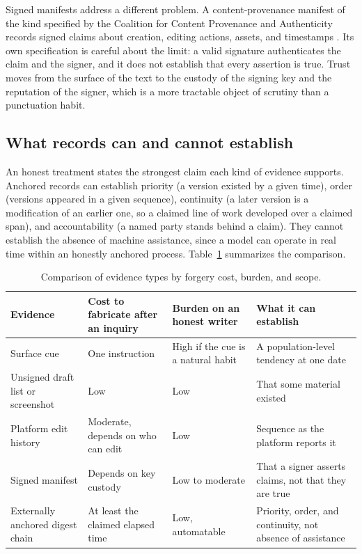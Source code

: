 \documentclass[11pt]{article}
\theoremstyle{plain}
\theoremstyle{definition}
\theoremstyle{remark}
\begin{document}
Signed manifests address a different problem. A content-provenance manifest of the kind specified by the Coalition for Content Provenance and Authenticity records signed claims about creation, editing actions, assets, and timestamps \cite{c2pa2025}. Its own specification is careful about the limit: a valid signature authenticates the claim and the signer, and it does not establish that every assertion is true. Trust moves from the surface of the text to the custody of the signing key and the reputation of the signer, which is a more tractable object of scrutiny than a punctuation habit.

\subsection{What records can and cannot establish}

An honest treatment states the strongest claim each kind of evidence supports. Anchored records can establish priority (a version existed by a given time), order (versions appeared in a given sequence), continuity (a later version is a modification of an earlier one, so a claimed line of work developed over a claimed span), and accountability (a named party stands behind a claim). They cannot establish the absence of machine assistance, since a model can operate in real time within an honestly anchored process. Table~\ref{tab:evidence} summarizes the comparison.

\begin{table}[ht]
\centering
\small
\renewcommand{\arraystretch}{1.25}
\begin{tabular}{@{}>{\raggedright\arraybackslash}p{}>{\raggedright\arraybackslash}p{}>{\raggedright\arraybackslash}p{}>{\raggedright\arraybackslash}p{}@{}}
\toprule
Evidence & Cost to fabricate after an inquiry & Burden on an honest writer & What it can establish \\
\midrule
Surface cue & One instruction & High if the cue is a natural habit & A population-level tendency at one date \\
Unsigned draft list or screenshot & Low & Low & That some material existed \\
Platform edit history & Moderate, depends on who can edit & Low & Sequence as the platform reports it \\
Signed manifest & Depends on key custody & Low to moderate & That a signer asserts claims, not that they are true \\
Externally anchored digest chain & At least the claimed elapsed time & Low, automatable & Priority, order, and continuity, not absence of assistance \\
\bottomrule
\end{tabular}
\caption{Comparison of evidence types by forgery cost, burden, and scope.}
\label{tab:evidence}
\end{table}
\end{document}
